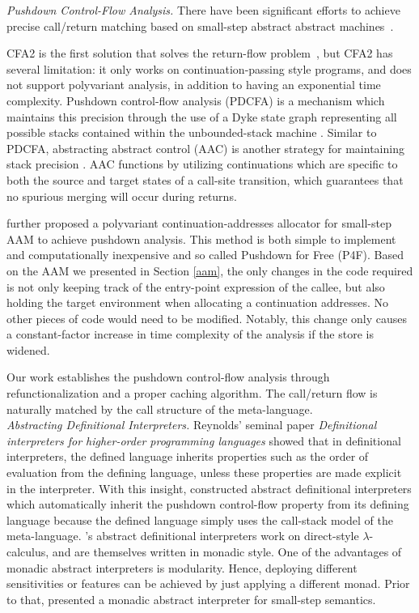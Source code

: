 \documentclass[acmsmall, review]{acmart}\settopmatter{}
\begin{document}
\textit{Pushdown Control-Flow Analysis.}
There have been significant efforts to achieve precise call/return matching 
based on small-step abstract abstract machines~\cite{vardoulakis2010cfa2, earl2012introspective,
gilray2016pushdown, johnson2015abstracting}.

CFA2 is the first solution that solves the return-flow problem~\cite{vardoulakis2010cfa2},
but CFA2 has several limitation: it only works on continuation-passing style programs, and
does not support polyvariant analysis, in addition to having an exponential time complexity.
Pushdown control-flow analysis (PDCFA) is a mechanism which maintains this precision through
the use of a Dyke state graph representing all possible stacks contained within the unbounded-stack
machine \cite{earl2012introspective, earl2010pushdown}. Similar to PDCFA, abstracting abstract
control (AAC) is another strategy for maintaining stack precision \cite{johnson2015abstracting}.
AAC functions by utilizing continuations which are specific to both the source and target states
of a call-site transition, which guarantees that no spurious merging will occur during returns.

 further proposed a polyvariant continuation-addresses allocator
for small-step AAM to achieve pushdown analysis. This method is both
simple to implement and computationally inexpensive and so called Pushdown for Free (P4F).
Based on the AAM we presented in Section \ref{aam}, the only changes in the code required is not
only keeping track of the entry-point expression of the callee, but also holding the target
environment when allocating a continuation addresses. No other pieces of code would need to be
modified. Notably, this change only causes a constant-factor increase in time complexity of
the analysis if the store is widened.

Our work establishes the pushdown control-flow analysis through refunctionalization and a
proper caching algorithm. The call/return flow is naturally matched by the call structure 
of the meta-language. \\

\textit{Abstracting Definitional Interpreters.}
Reynolds' seminal paper \emph{Definitional interpreters for higher-order programming languages} 
\cite{Reynolds:72, Reynolds:HOSC98-revisited} showed that in definitional interpreters, the
defined language inherits properties such as the order of evaluation from the defining
language, unless these properties are made explicit in the 
interpreter. With this insight,
\citet{darais2017abstracting} constructed abstract definitional interpreters which
automatically inherit the pushdown control-flow property from its defining language because
the defined language simply uses the call-stack model of the meta-language.
\citeauthor{darais2017abstracting}'s abstract definitional interpreters work on direct-style
$\lambda$-calculus, and are themselves written in monadic style. One of the advantages of monadic
abstract interpreters is modularity. Hence, deploying different sensitivities
or features can be achieved by just applying a different monad. Prior to that, \citet{Sergey:2013:MAI:2491956.2491979}
presented a monadic abstract interpreter for small-step semantics.
\end{document}
